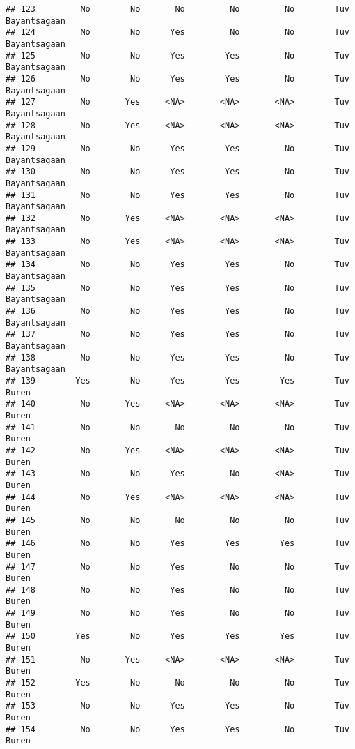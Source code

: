 \documentclass[
]{article}
\begin{document}
\begin{verbatim}
## 123         No        No       No         No         No        Tuv Bayantsagaan
## 124         No        No      Yes         No         No        Tuv Bayantsagaan
## 125         No        No      Yes        Yes         No        Tuv Bayantsagaan
## 126         No        No      Yes        Yes         No        Tuv Bayantsagaan
## 127         No       Yes     <NA>       <NA>       <NA>        Tuv Bayantsagaan
## 128         No       Yes     <NA>       <NA>       <NA>        Tuv Bayantsagaan
## 129         No        No      Yes        Yes         No        Tuv Bayantsagaan
## 130         No        No      Yes        Yes         No        Tuv Bayantsagaan
## 131         No        No      Yes        Yes         No        Tuv Bayantsagaan
## 132         No       Yes     <NA>       <NA>       <NA>        Tuv Bayantsagaan
## 133         No       Yes     <NA>       <NA>       <NA>        Tuv Bayantsagaan
## 134         No        No      Yes        Yes         No        Tuv Bayantsagaan
## 135         No        No      Yes        Yes         No        Tuv Bayantsagaan
## 136         No        No      Yes        Yes         No        Tuv Bayantsagaan
## 137         No        No      Yes        Yes         No        Tuv Bayantsagaan
## 138         No        No      Yes        Yes         No        Tuv Bayantsagaan
## 139        Yes        No      Yes        Yes        Yes        Tuv        Buren
## 140         No       Yes     <NA>       <NA>       <NA>        Tuv        Buren
## 141         No        No       No         No         No        Tuv        Buren
## 142         No       Yes     <NA>       <NA>       <NA>        Tuv        Buren
## 143         No        No      Yes         No       <NA>        Tuv        Buren
## 144         No       Yes     <NA>       <NA>       <NA>        Tuv        Buren
## 145         No        No       No         No         No        Tuv        Buren
## 146         No        No      Yes        Yes        Yes        Tuv        Buren
## 147         No        No      Yes         No         No        Tuv        Buren
## 148         No        No      Yes         No         No        Tuv        Buren
## 149         No        No      Yes         No         No        Tuv        Buren
## 150        Yes        No      Yes        Yes        Yes        Tuv        Buren
## 151         No       Yes     <NA>       <NA>       <NA>        Tuv        Buren
## 152        Yes        No       No         No         No        Tuv        Buren
## 153         No        No      Yes        Yes         No        Tuv        Buren
## 154         No        No      Yes        Yes         No        Tuv        Buren

\end{verbatim}
\end{document}
